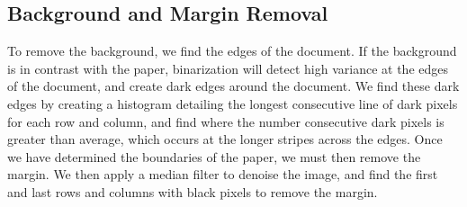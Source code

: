 \documentclass{report}
\begin{document}
\subsection{Background and Margin Removal}
To remove the background, we find the edges of the document. If the background is in contrast with the paper, binarization will detect high variance at the edges of the document, and create dark edges around the document. We find these dark edges by creating a histogram detailing the longest consecutive line of dark pixels for each row and column, and find where the number consecutive dark pixels is greater than average, which occurs at the longer stripes across the edges. Once we have determined the boundaries of the paper, we must then remove the margin. We then apply a median filter to denoise the image, and find the first and last rows and columns with black pixels to remove the margin.
\end{document}
